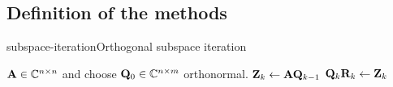 \subsection{Definition of the methods}


\begin{Algorithm*}{subspace-iteration}{Orthogonal subspace iteration}
  \begin{algorithmic}[1]
    \Require $\mathbf A\in\mathbb C^{n\times n}$ and choose $\mathbf Q_0 \in \mathbb C^{n\times m}$ orthonormal.
    \State $\mathbf Z_k \gets \mathbf A \mathbf Q_{k-1}$
    \State $\mathbf Q_k\mathbf R_k \gets \mathbf Z_k$ 
    \
    \EndFor
  \end{algorithmic}
\end{Algorithm*}

